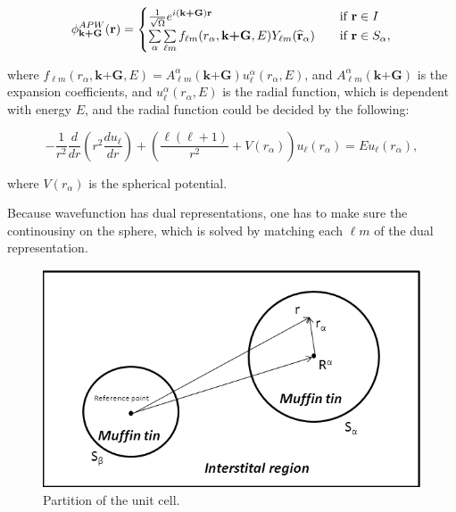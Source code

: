\documentclass[a4paper, 12pt, titlepage,oneside,drop]{kthesis}
\begin{document}
\begin{equation}\label{ap1}
\phi^{APW}_{\textbf {k+G}} ({\textbf r})= 
\begin{cases} \frac {1}{\sqrt{\Omega}} e^{i({ \textbf {k+G}}) {\textbf r}} & \quad \mbox{if ${\textbf r} \in I $} 
\\
\sumg<\alpha>\sum\limits_{{\ell}m} f_{{\ell}{m}} (r_{\alpha},{\textbf {k+G}}, E) Y_{{\ell}m}(\widehat{{\textbf r}}_{\alpha})  & \quad \mbox{if $ {\textbf r} \in S_\alpha, $}\\ 
\end{cases}
\end{equation}





\noindent where $f_{{\ell}{m}} (r_{\alpha},\textbf{k+G} ,E) =  A _{{\ell}m}^{\alpha} ( \textbf {k+G}) u_{{\ell}}^{\alpha}(r_{\alpha}, E)$, and $A _{{\ell}m}^{\alpha} (\textbf {k+G}) $ is the expansion coefficients, and $u_{{\ell}}^{\alpha} (r_{\alpha}, E)$  is the radial function, which is dependent with energy $E$, and the
radial function could be decided by the following:


\begin{equation}\label{ap2}
-\frac{1}{r^2}  \frac{d}{dr} (r^2 \frac{du_{\ell}}{dr})+ \left(\frac{\ell(\ell+1)}{r^2}+V(r_{\alpha})\right)u_{\ell}(r_{\alpha}) = E u_{\ell}(r_{\alpha}),
\end{equation}


\noindent where $V(r_{\alpha})$ is the spherical potential.


\noindent Because wavefunction has dual representations, one has to make sure the continousiny on the sphere, which is solved by matching each $\ell m$
of the dual representation.

\begin{figure}[h]
\begin{center}
\includegraphics[scale=0.7]{Presentation1.png}
\caption{Partition of the unit cell.}
\label{ucuc}
\end{center}
\end{figure}
\end{document}
